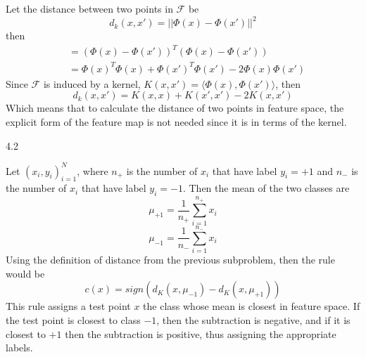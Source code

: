 \documentclass[12pt]{report}
\begin{document}
Let the distance between two points in $\mathcal{F}$ be
$$ d_{k}(x, x') = \lvert \lvert \Phi (x) - \Phi (x') \rvert \rvert^{2} $$
then
\begin{equation}
  \begin{aligned}
    & = \left( \Phi (x) - \Phi (x') \right)^{T} \left( \Phi (x) - \Phi (x') \right) \\
    & = \Phi (x)^{T} \Phi (x) + \Phi (x')^T \Phi (x') -2\Phi (x)\Phi (x')
  \end{aligned}
\end{equation}
Since $\mathcal{F}$ is induced by a kernel, $K(x, x') = \langle \Phi (x), \Phi (x') \rangle$, then
$$ d_{k}(x, x') = K(x,x) + K(x', x') -2K(x, x') $$
Which means that to calculate the distance of two points in feature space, the explicit form of the feature map is not needed since it is in terms of the kernel.

4.2

Let ${(x_{i}, y_{i})}^{N}_{i=1}$, where $n_{+}$ is the number of $x_{i}$ that have label $y_{i} = +1$
and $n_{-}$ is the number of $x_{i}$ that have label $y_{i} =-1$. Then the mean of the two classes are
$$ \mu_{+1} = \frac{1}{n_{+}} \sum^{n_{+}}_{i=1} x_{i}$$
$$ \mu_{-1} = \frac{1}{n_{-}} \sum^{n_{-}}_{i=1} x_{i}$$
Using the definition of distance from the previous subproblem, then the rule would be
$$c(x) = sign(d_{K}(x, \mu_{-1}) - d_{K}(x, \mu_{+1}))$$
This rule assigns a test point $x$ the class whose mean is closest in feature space. If the test point is closest to class $-1$, then the subtraction is negative, and if it is closest to $+1$ then the subtraction is positive, thus assigning the appropriate labels.  
\end{document}
